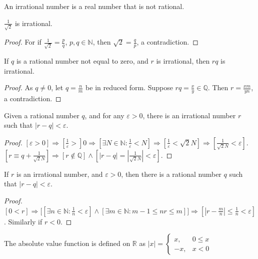 \documentclass[crop=false,class=book,oneside]{standalone}
\begin{document}
            \begin{definition}
            An irrational number is a real number that is not rational.
            \end{definition}
            \begin{corollary}
            $\frac{1}{\sqrt{2}}$ is irrational. 
            \end{corollary}
            \begin{proof}
            For if $\frac{1}{\sqrt{2}} = \frac{p}{q}$, $p,q\in \mathbb{N}$, then $\sqrt{2} = \frac{q}{p}$, a contradiction.
            \end{proof}
            \begin{lemma}
            If $q$ is a rational number not equal to zero, and $r$ is irrational, then $rq$ is irrational.
            \end{lemma}
            \begin{proof}
            As $q\ne 0$, let $q = \frac{n}{m}$ be in reduced form. Suppose $rq = \frac{x}{y}\in \mathbb{Q}$. Then $r=\frac{xm}{yn}$, a contradiction.
            \end{proof}
            \begin{theorem}
            Given a rational number $q$, and for any $\varepsilon>0$, there is an irrational number $r$ such that $|r-q|<\varepsilon$.
            \end{theorem}
            \begin{proof}
            $[\varepsilon>0]\Rightarrow [\frac{1}{\varepsilon}>]0\Rightarrow [\exists N\in \mathbb{N}:\frac{1}{\varepsilon}<N]\Rightarrow [\frac{1}{\varepsilon} < \sqrt{2}N]\Rightarrow [\frac{1}{\sqrt{2}N}< \varepsilon]$. $[r \equiv q+\frac{1}{\sqrt{2}{N}}]\Rightarrow [r\notin \mathbb{Q}]\land [|r-q| = |\frac{1}{\sqrt{2}N}| < \varepsilon]$.
            \end{proof}
            \begin{theorem}
            If $r$ is an irrational number, and $\varepsilon>0$, then there is a rational number $q$ such that $|r-q|<\varepsilon$.
            \end{theorem}
            \begin{proof}
            $[0<r]\Rightarrow \big[[\exists n\in \mathbb{N}: \frac{1}{n} < \varepsilon]\land[\exists m\in \mathbb{N}: m-1\leq nr \leq m]\big]\Rightarrow[|r-\frac{m}{n}| \leq \frac{1}{n} < \varepsilon]$. Similarly if $r<0$.
            \end{proof}
            \begin{definition}
            The absolute value function is defined on $\mathbb{R}$ as $|x| = \begin{cases} x, & 0 \leq x \\ -x, & x<0 \end{cases}$
            \end{definition}
\end{document}
